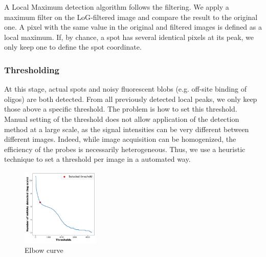 A Local Maximum detection algorithm follows the filtering.
We apply a maximum filter on the \ac{LoG}-filtered image and compare the result to the original one.
A pixel with the same value in the original and filtered images is defined as a local maximum.
If, by chance, a spot has several identical pixels at its peak, we only keep one to define the spot coordinate.


\subsubsection{Thresholding}

At this stage, actual spots and noisy fluorescent blobs (e.g. off-site binding of oligos) are both detected.
From all previously detected local peaks, we only keep those above a specific threshold.
The problem is how to set this threshold. 
Manual setting of the threshold does not allow application of the detection method at a large scale, as the signal intensities can be very different between different images. Indeed, while image acquisition can be homogenized, the efficiency of the probes is necessarily heterogeneous. 
Thus, we use a heuristic technique to set a threshold per image in a automated way.

\begin{figure}
	\begin{center}
		\includegraphics[width=0.33\textwidth]{figures/chapter2/elbow_curve_real}
	\caption{Elbow curve}
	\label{fig:elbow_detection}
	\end{center}
\end{figure}

